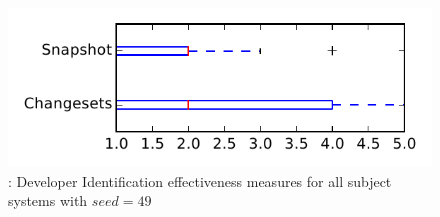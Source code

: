 
\begin{figure}
\centering
\includegraphics[height=0.4\textheight]{figures/dit_seed/rq1_tiny_49}
\caption{\rtwo: Developer Identification effectiveness measures for all subject systems with $seed=49$}
\label{fig:dit_seed:rq1:tiny}
\end{figure}
